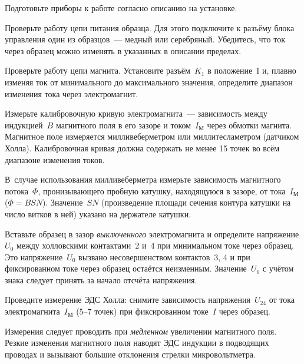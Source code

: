 \begin{lab:task}



\item Подготовьте приборы к работе согласно описанию на установке.

\item Проверьте работу цепи питания образца. Для этого подключите к разъёму
блока управления один из образцов~--- медный или серебряный. Убедитесь, что ток
через образец можно изменять в указанных в описании пределах.

\item Проверьте работу цепи магнита. Установите разъём~$K_1$ в положение~I и,
плавно изменяя ток от минимального до максимального значения, 
определите диапазон изменения тока через электромагнит.

\item Измерьте калибровочную кривую электромагнита~---
зависимость между индукцией~$B$ магнитного поля в его зазоре и 
током~$I_{М}$ через обмотки магнита.
Магнитное поле измеряется милливеберметром или миллитесламетром
(датчиком Холла). Калибровочная кривая должна содержать не менее
15 точек во всём диапазоне изменения токов.

В~случае использования милливеберметра измерьте зависимость 
магнитного потока~$\Phi$, пронизывающего пробную катушку, 
находящуюся в зазоре, от тока~$I_{М}$ ($\Phi=BSN$). 
Значение~$SN$ (произведение площади сечения контура катушки на
число витков в ней) указано на держателе катушки.

\item \label{p1} Вставьте образец в зазор \emph{выключенного} электромагнита 
и определите напряжение $U_0$ между холловскими
контактами~2 и~4 при минимальном токе через образец. 
Это напряжение~$U_0$ вызвано несовершенством контактов~3, 4 и при 
фиксированном токе через образец остаётся неизменным. Значение~$U_0$ с учётом 
знака следует принять за начало отсчёта напряжения.

\item \label{p2} Проведите измерение ЭДС Холла: снимите зависимость 
напряжения~$U_{24}$ от тока электромагнита~$I_{М}$ (5--7 точек) 
при фиксированном токе~$I$ через образец.

Измерения следует проводить при \emph{медленном} увеличении магнитного поля. 
Резкие изменения магнитного поля наводят ЭДС индукции в подводящих проводах 
и вызывают большие отклонения стрелки микровольтметра.


\end{lab:task}
